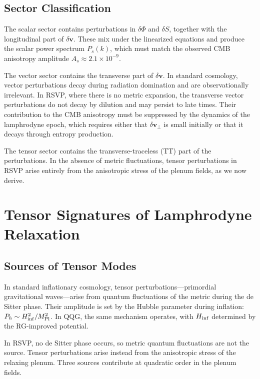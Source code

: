 \documentclass[12pt, a4paper]{article}
\newcommand{\vv}{\mathbf{v}}
\begin{document}
\subsection{Sector Classification}

The scalar sector contains perturbations in $\delta\Phi$ and $\delta S$, together
with the longitudinal part of $\delta\vv$. These mix under the linearized equations
and produce the scalar power spectrum $P_s(k)$, which must match the observed CMB
anisotropy amplitude $A_s \approx 2.1 \times 10^{-9}$.

The vector sector contains the transverse part of $\delta\vv$. In standard
cosmology, vector perturbations decay during radiation domination and are
observationally irrelevant. In RSVP, where there is no metric expansion, the
transverse vector perturbations do not decay by dilution and may persist to late
times. Their contribution to the CMB anisotropy must be suppressed by the dynamics
of the lamphrodyne epoch, which requires either that $\delta\vv_\perp$ is small
initially or that it decays through entropy production.

The tensor sector contains the transverse-traceless (TT) part of the perturbations.
In the absence of metric fluctuations, tensor perturbations in RSVP arise entirely
from the anisotropic stress of the plenum fields, as we now derive.

\section{Tensor Signatures of Lamphrodyne Relaxation}
\label{sec:tensor}

\subsection{Sources of Tensor Modes}

In standard inflationary cosmology, tensor perturbations---primordial gravitational
waves---arise from quantum fluctuations of the metric during the de Sitter phase.
Their amplitude is set by the Hubble parameter during inflation: $P_h \sim
H_{\rm inf}^2/M_{\rm Pl}^2$. In QQG, the same mechanism operates, with $H_{\rm
inf}$ determined by the RG-improved potential.

In RSVP, no de Sitter phase occurs, so metric quantum fluctuations are not the
source. Tensor perturbations arise instead from the anisotropic stress of the
relaxing plenum. Three sources contribute at quadratic order in the plenum fields.
\end{document}
